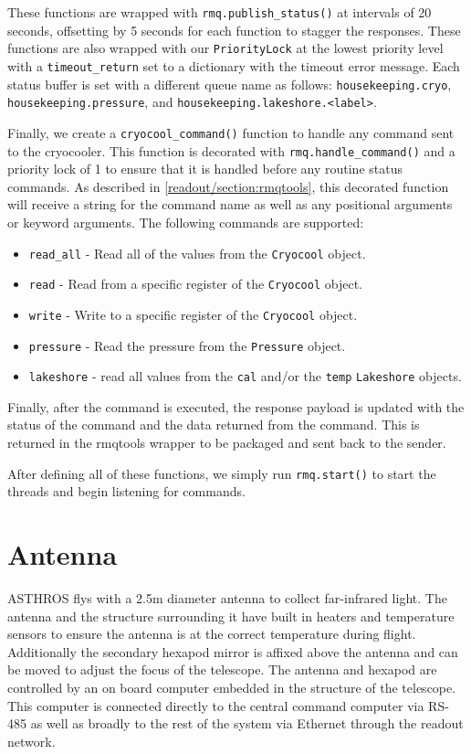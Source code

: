 These functions are wrapped with \texttt{rmq.publish\_status()} at intervals of 20 seconds, offsetting by 5 seconds for each function to stagger the responses. 
These functions are also wrapped with our \texttt{PriorityLock} at the lowest priority level with a \texttt{timeout\_return} set to a dictionary with the timeout error message.
Each status buffer is set with a different queue name as follows: \texttt{housekeeping.cryo}, \texttt{housekeeping.pressure}, and \texttt{housekeeping.lakeshore.<label>}.

Finally, we create a \texttt{cryocool\_command()} function to handle any command sent to the cryocooler.
This function is decorated with \texttt{rmq.handle\_command()} and a priority lock of 1 to ensure that it is handled before any routine status commands.
As described in \ref{readout/section:rmqtools}, this decorated function will receive a string for the command name as well as any positional arguments or keyword arguments.
The following commands are supported:

\begin{itemize}
    \item \texttt{read\_all} - Read all of the values from the \texttt{Cryocool} object. 
    \item \texttt{read} - Read from a specific register of the \texttt{Cryocool} object.
    \item \texttt{write} - Write to a specific register of the \texttt{Cryocool} object.
    \item \texttt{pressure} - Read the pressure from the \texttt{Pressure} object.
    \item \texttt{lakeshore} - read all values from the \texttt{cal} and/or the \texttt{temp} \texttt{Lakeshore} objects.
\end{itemize}

Finally, after the command is executed, the response payload is updated with the status of the command and the data returned from the command.
This is returned in the rmqtools wrapper to be packaged and sent back to the sender.

After defining all of these functions, we simply run \texttt{rmq.start()} to start the threads and begin listening for commands.

\section{Antenna}
ASTHROS flys with a 2.5m diameter antenna to collect far-infrared light. 
The antenna and the structure surrounding it have built in heaters and temperature sensors to ensure the antenna is at the correct temperature during flight.
Additionally the secondary hexapod mirror is affixed above the antenna and can be moved to adjust the focus of the telescope.
The antenna and hexapod are controlled by an on board computer embedded in the structure of the telescope.
This computer is connected directly to the central command computer via RS-485 as well as broadly to the rest of the system via Ethernet through the readout network.

